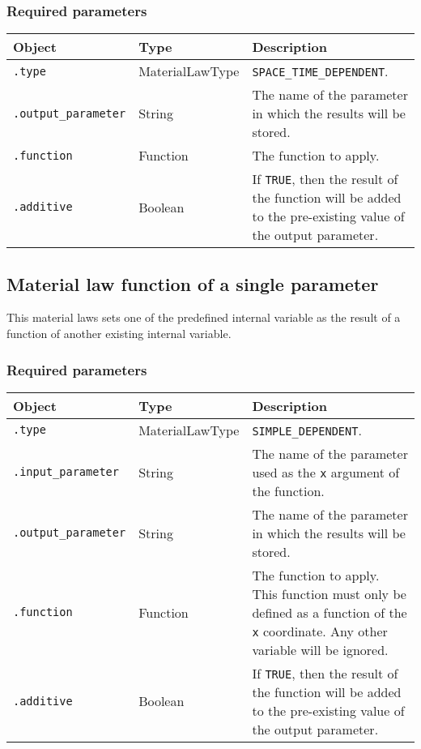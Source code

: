 \documentclass[10pt]{article}
\begin{document}
\subsubsection*{Required parameters}

\begin{tabularx}{\textwidth}{llX}
\hline 
Object & Type & Description \\ 
\hline 
\verb+.type+ & MaterialLawType & \verb+SPACE_TIME_DEPENDENT+. \\ 
\verb+.output_parameter+ & String & The name of the parameter in which the results will be stored.\\
\verb+.function+ & Function & The function to apply.\\
\verb+.additive+ & Boolean & If \verb+TRUE+, then the result of the function will be added to the pre-existing value of the output parameter.\\
\hline 
\end{tabularx}

\subsection{Material law function of a single parameter}

This material laws sets one of the predefined internal variable as the result of a function of another existing internal variable.

\subsubsection*{Required parameters}

\begin{tabularx}{\textwidth}{llX}
\hline 
Object & Type & Description \\ 
\hline 
\verb+.type+ & MaterialLawType & \verb+SIMPLE_DEPENDENT+. \\ 
\verb+.input_parameter+ & String & The name of the parameter used as the \verb+x+ argument of the function.\\
\verb+.output_parameter+ & String & The name of the parameter in which the results will be stored.\\
\verb+.function+ & Function & The function to apply. This function must only be defined as a function of the \verb+x+ coordinate. Any other variable will be ignored. \\
\verb+.additive+ & Boolean & If \verb+TRUE+, then the result of the function will be added to the pre-existing value of the output parameter.\\
\hline 
\end{tabularx}
\end{document}
